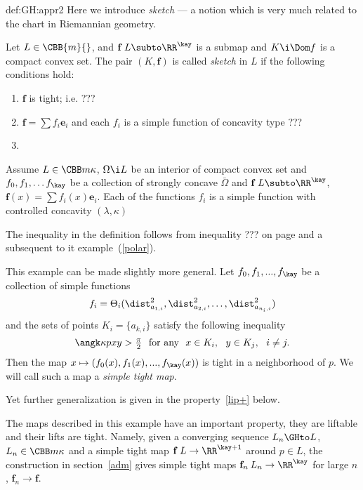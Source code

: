 {\begin{subthm}{def:GH:appr2}
 Here we introduce \emph{sketch} --- a notion which is very much related to the chart in Riemannian geometry.

Let $L\in\CBB{m}{}$, and $\mathbf f\: L\subto\RR^\kay$ is a submap and $K\i \Dom f$ is a compact convex set.
The pair $(K, \mathbf f)$ is called \emph{sketch} in $L$ if the following conditions hold:

\begin{enumerate}
\item $\mathbf f$ is tight; i.e. ???
\item $\mathbf f=\sum f_i\mathbf e_i$ and each $f_i$ is a simple function of concavity type ???
\item 
\end{enumerate}


Assume $L\in \CBB m\kappa$, $\Omega\i L$ be an interior of compact convex set and $f_0,f_1,\dots f_\kay$ be a collection of strongly concave $\bar\Omega$ and $\mathbf f\:L\subto \RR^\kay$, $\mathbf f(x)=\sum f_i(x)\mathbf e_i$.
Each of the functions $f_i$ is a simple function with controlled concavity $(\lambda,\kappa)$



















The inequality in the definition follows from inequality ???
on page \pageref{**-polar-inq} and a subsequent to it example~(\ref{polar}).

This example can be made slightly more general.
Let $f_0,f_1,...,f_\kay$ be a collection of simple functions
$$f_i=\Theta_i(\dist_{a_{1,i}}^2,\dist_{a_{2,i}}^2,\dots, \dist_{a_{n_i,i}}^2)$$
and the sets of points $K_i=\{a_{k,i}\}$ satisfy the following inequality
$$\angk\kappa p x y>\tfrac\pi2\ \ \text{for any}\ \  x\in K_i,\ \  y\in K_j,\ \ i\not=j.$$
Then the map
$x\mapsto(f_0(x),f_1(x),...,f_\kay(x))$
is tight in a neighborhood of $p$.
 We will call such a map a \emph{simple tight map}.

Yet further generalization is given in the property~\ref{lip+} below.

The maps described in this example have an important property, they are liftable
and their lifts are tight. 
Namely, given a converging sequence $L_n\GHto L$, $L_n\in\CBB m\kappa$ and a
simple tight map $\mathbf{f}\:L\to \RR^{\kay+1}$ around $p\in L$, the construction in
section~\ref{adm} gives simple tight maps $\mathbf{f}_n\:L_n\to \RR^\kay$ for large $n$, $\mathbf{f}_n\to \mathbf{f}$.


\end{subthm}}
